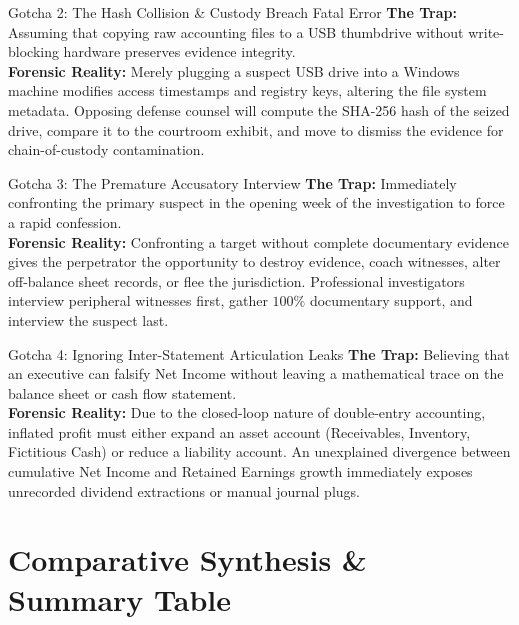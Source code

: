\begin{trapbox}{Gotcha 2: The Hash Collision \& Custody Breach Fatal Error}
\textbf{The Trap:} Assuming that copying raw accounting files to a USB thumbdrive without write-blocking hardware preserves evidence integrity.\\
\textbf{Forensic Reality:} Merely plugging a suspect USB drive into a Windows machine modifies access timestamps and registry keys, altering the file system metadata. Opposing defense counsel will compute the SHA-256 hash of the seized drive, compare it to the courtroom exhibit, and move to dismiss the evidence for chain-of-custody contamination.
\end{trapbox}

\begin{trapbox}{Gotcha 3: The Premature Accusatory Interview}
\textbf{The Trap:} Immediately confronting the primary suspect in the opening week of the investigation to force a rapid confession.\\
\textbf{Forensic Reality:} Confronting a target without complete documentary evidence gives the perpetrator the opportunity to destroy evidence, coach witnesses, alter off-balance sheet records, or flee the jurisdiction. Professional investigators interview peripheral witnesses first, gather $100\%$ documentary support, and interview the suspect last.
\end{trapbox}

\begin{trapbox}{Gotcha 4: Ignoring Inter-Statement Articulation Leaks}
\textbf{The Trap:} Believing that an executive can falsify Net Income without leaving a mathematical trace on the balance sheet or cash flow statement.\\
\textbf{Forensic Reality:} Due to the closed-loop nature of double-entry accounting, inflated profit must either expand an asset account (Receivables, Inventory, Fictitious Cash) or reduce a liability account. An unexplained divergence between cumulative Net Income and Retained Earnings growth immediately exposes unrecorded dividend extractions or manual journal plugs.
\end{trapbox}

\section{Comparative Synthesis \& Summary Table}

